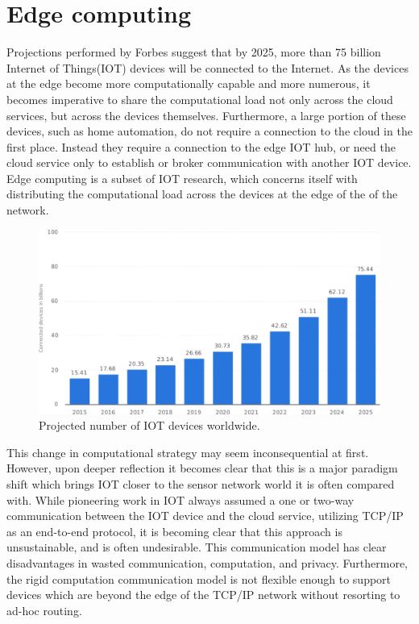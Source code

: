 \section{Edge computing}\label{sec:lit:edge-computing}
Projections performed by Forbes suggest that by 2025, more than 75 billion Internet of Things(IOT) devices will be connected to the Internet.\cite{forbesiot}
As the devices at the edge become more computationally capable and more numerous, it becomes imperative to share the computational load not only across the cloud services, but across the devices themselves.
Furthermore, a large portion of these devices, such as home automation, do not require a connection to the cloud in the first place.
Instead they require a connection to the edge IOT hub, or need the cloud service only to establish or broker communication with another IOT device.
Edge computing is a subset of IOT research, which concerns itself with distributing the computational load across the devices at the edge of the of the network. \cite{satyanarayanan2017emergence}
\begin{figure}[h]
    \centering
    \includegraphics[width=0.8\linewidth]{img/iot_statistics.pdf}
    \caption{Projected number of IOT devices worldwide.\cite{forbesiot}}
    \label{lit:fig:1}
\end{figure}

This change in computational strategy may seem inconsequential at first.
However, upon deeper reflection it becomes clear that this is a major paradigm shift which brings IOT closer to the sensor network world it is often compared with.
While pioneering work in IOT always assumed a one or two-way communication between the IOT device and the cloud service, utilizing TCP/IP as an end-to-end protocol, it is becoming clear that this approach is unsustainable, and is often undesirable.
This communication model has clear disadvantages in wasted communication, computation, and privacy.
Furthermore, the rigid computation communication model is not flexible enough to support devices which are beyond the edge of the TCP/IP network without resorting to ad-hoc routing. \cite{gagliardi2011content}

